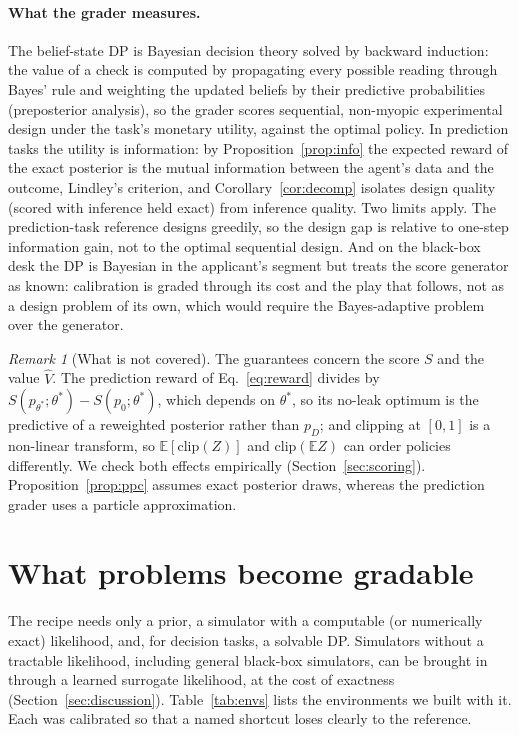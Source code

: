 \documentclass[10pt]{article}
\theoremstyle{definition}
\theoremstyle{remark}
\newtheorem{remark}{Remark}
\theoremstyle{plain}
\newcommand{\E}{\mathbb{E}}
\newcommand{\thetastar}{\theta^{*}}
\begin{document}
\paragraph{What the grader measures.} The belief-state DP is Bayesian decision theory solved by
backward induction: the value of a check is computed by propagating every possible reading through
Bayes' rule and weighting the updated beliefs by their predictive probabilities (preposterior
analysis), so the grader scores sequential, non-myopic experimental design under the task's
monetary utility, against the optimal policy. In prediction tasks the utility is information:
by Proposition~\ref{prop:info} the expected reward of the exact posterior is the mutual
information between the agent's data and the outcome, Lindley's criterion, and
Corollary~\ref{cor:decomp} isolates design quality (scored with inference held exact) from
inference quality. Two limits apply. The prediction-task reference designs greedily, so the
design gap is relative to one-step information gain, not to the optimal sequential design. And
on the black-box desk the DP is Bayesian in the applicant's segment but treats the score
generator as known: calibration is graded through its cost and the play that follows, not as a
design problem of its own, which would require the Bayes-adaptive problem over the generator.

\begin{remark}[What is not covered]\label{rem:limits}
The guarantees concern the score $S$ and the value $\hat V$. The prediction reward of
Eq.~\eqref{eq:reward} divides by $S(p_{\thetastar};\thetastar)-S(p_0;\thetastar)$, which depends on
$\thetastar$, so its no-leak optimum is the predictive of a reweighted posterior rather than $p_D$;
and clipping at $[0,1]$ is a non-linear transform, so $\E[\mathrm{clip}(Z)]$ and
$\mathrm{clip}(\E Z)$ can order policies differently. We check both effects empirically
(Section~\ref{sec:scoring}). Proposition~\ref{prop:ppc} assumes exact posterior draws, whereas
the prediction grader uses a particle approximation.
\end{remark}

\section{What problems become gradable}
\label{sec:problems}

The recipe needs only a prior, a simulator with a computable (or numerically exact) likelihood,
and, for decision tasks, a solvable DP. Simulators without a tractable likelihood, including
general black-box simulators, can be brought in through a learned surrogate likelihood, at the
cost of exactness (Section~\ref{sec:discussion}). Table~\ref{tab:envs} lists the environments we built
with it. Each was calibrated so that a named shortcut loses clearly to the reference.
\end{document}
